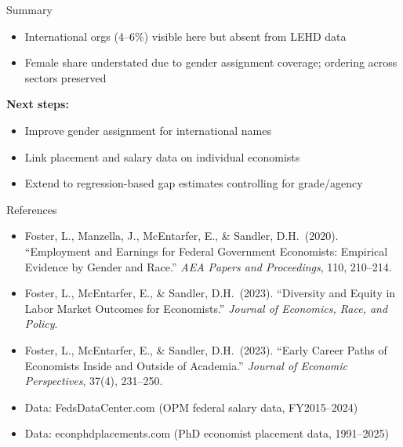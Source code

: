 \documentclass[aspectratio=169]{beamer}
\begin{document}
\begin{frame}[allowframebreaks]{Summary}
\begin{itemize}
    \item International orgs (4--6\%) visible here but absent from LEHD data
    \item Female share understated due to gender assignment coverage;
          ordering across sectors preserved
  \end{itemize}
  \vspace{0.4em}
  \textbf{Next steps:}
  \begin{itemize}
    \item Improve gender assignment for international names
    \item Link placement and salary data on individual economists
    \item Extend to regression-based gap estimates controlling for grade/agency
  \end{itemize}
\end{frame}

\begin{frame}[allowframebreaks]{References}
  \small
  \begin{itemize}
    \item Foster, L., Manzella, J., McEntarfer, E., \& Sandler, D.H.\ (2020).
          ``Employment and Earnings for Federal Government Economists: Empirical
          Evidence by Gender and Race.''
          \textit{AEA Papers and Proceedings}, 110, 210--214.
    \item Foster, L., McEntarfer, E., \& Sandler, D.H.\ (2023).
          ``Diversity and Equity in Labor Market Outcomes for Economists.''
          \textit{Journal of Economics, Race, and Policy}.
    \item Foster, L., McEntarfer, E., \& Sandler, D.H.\ (2023).
          ``Early Career Paths of Economists Inside and Outside of Academia.''
          \textit{Journal of Economic Perspectives}, 37(4), 231--250.
    \item Data: FedsDataCenter.com (OPM federal salary data, FY2015--2024)
    \item Data: econphdplacements.com (PhD economist placement data, 1991--2025)
  \end{itemize}
\end{frame}
\end{document}
